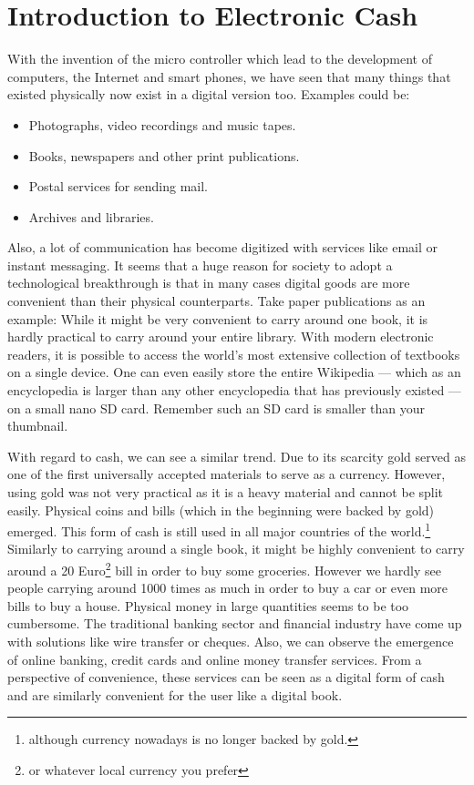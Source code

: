 \documentclass[a4paper,12pt,oneside,openany]{book}
\begin{document}
\section{Introduction to Electronic Cash}
With the invention of the micro controller which lead to the development of computers, the Internet and smart phones, we have seen that many things that existed physically now exist in a digital version too.
Examples could be:
\begin{itemize}
\item Photographs, video recordings and music tapes.
\item Books, newspapers and other print publications.
\item Postal services for sending mail.
\item Archives and libraries.
\end{itemize}

Also, a lot of communication has become digitized with services like email or instant messaging.
It seems that a huge reason for society to adopt a technological breakthrough is that in many cases digital goods are more convenient than their physical counterparts.
Take paper publications as an example: While it might be very convenient to carry around one book, it is hardly practical to carry around your entire library.
With modern electronic readers, it is possible to access the world's most extensive collection of textbooks on a single device.
One can even easily store the entire Wikipedia --- which as an encyclopedia is larger than any other encyclopedia that has previously existed --- on a small nano SD card.
Remember such an SD card is smaller than your thumbnail.

With regard to cash, we can see a similar trend.
Due to its scarcity gold served as one of the first universally accepted materials to serve as a currency.
However, using gold was not very practical as it is a heavy material and cannot be split easily.
Physical coins and bills (which in the beginning were backed by gold) emerged.
This form of cash is still used in all major countries of the world.\footnote{although currency nowadays is no longer backed by gold.}
Similarly to carrying around a single book, it might be highly convenient to carry around a 20 Euro\footnote{or whatever local currency you prefer} bill in order to buy some groceries. However we hardly see people carrying around 1000 times as much in order to buy a car or even more bills to buy a house.
Physical money in large quantities seems to be too cumbersome. 
The traditional banking sector and financial industry have come up with solutions like wire transfer or cheques.
Also, we can observe the emergence of online banking, credit cards and online money transfer services.
From a perspective of convenience, these services can be seen as a digital form of cash and are similarly convenient for the user like a digital book.
\end{document}
